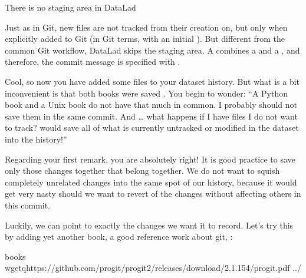 \ignorespaces \begin{gitusernote}[label={index-10}, before title={\thetcbcounter\ }, float, floatplacement=tb, check odd page=true]{There is no staging area in DataLad}
\label{\detokenize{basics/101-102-populate:index-10}}

\sphinxAtStartPar
Just as in Git, new files are not tracked from their creation on, but only when
explicitly added to Git (in Git terms, with an initial ). But different
from the common Git workflow, DataLad skips the staging area. A 
combines a  and a , and therefore, the commit message
is specified with .


\end{gitusernote}

\sphinxAtStartPar
Cool, so now you have added some files to your dataset history. But what is a bit
inconvenient is that both books were saved . You begin to wonder: “A Python
book and a Unix book do not have that much in common. I probably should not save them
in the same commit. And … what happens if I have files I do not want to track?
 would save all of what is currently
untracked or modified in the dataset into the history!”

\sphinxAtStartPar
Regarding your first remark, you are absolutely right!
It is good practice to save only those changes
together that belong together. We do not want to squish completely unrelated changes
into the same spot of our history, because it would get very nasty should we want to
revert  of the changes without affecting others in this commit.

\sphinxAtStartPar
Luckily, we can point  to exactly the changes we want it to record.
Let’s try this by adding yet another book, a good reference work about git,
:

\begin{sphinxVerbatim}[commandchars=\\\{\}]
books
wget\PYGZhy{}qhttps://github.com/progit/progit2/releases/download/2.1.154/progit.pdf
../
\end{sphinxVerbatim}

